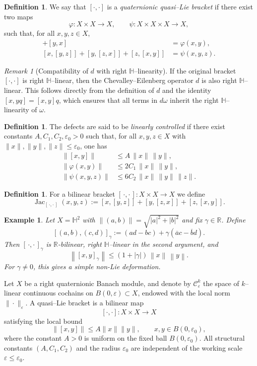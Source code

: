 \documentclass[10pt]{amsart}
\newcommand{\norm}[1]{\left\lVert #1 \right\rVert}
\newcommand{\Jac}{\operatorname{Jac}}
\numberwithin{equation}{section}
\newtheorem{example}[theorem]{Example}
\theoremstyle{remark}
\newtheorem{rmk}[theorem]{Remark}
\theoremstyle{definition}
\newtheorem{dfn}[theorem]{Definition}
\begin{document}
\begin{dfn}\label{def:quasiLie}
We say that $[\cdot,\cdot]$ is a \emph{quaternionic quasi--Lie bracket} if there exist two maps
\[
\varphi : X\times X \to X,
\qquad
\psi : X\times X\times X \to X,
\]
such that, for all $x,y,z\in X$,
\begin{align}
[x,y] + [y,x] &= \varphi(x,y), \label{eq:phiDef}\\
[x,[y,z]] + [y,[z,x]] + [z,[x,y]] &= \psi(x,y,z). \label{eq:psiDef}
\end{align}
\end{dfn}
\begin{rmk}[Compatibility of $d$ with right $\mathbb{H}$--linearity]
If the original bracket $[\cdot,\cdot]$ is right $\mathbb{H}$--linear, then the Chevalley--Eilenberg operator $d$ is also right $\mathbb{H}$--linear. This follows directly from the definition of $d$ and the identity $[x, yq] = [x, y]q$, which ensures that all terms in $d\omega$ inherit the right $\mathbb{H}$--linearity of $\omega$.
\end{rmk}
\begin{dfn}\label{def:controle}
The defects are said to be \emph{linearly controlled} if there exist constants
$A,C_1,C_2,\varepsilon_0>0$ such that, for all $x,y,z\in X$ with
$\|x\|,\|y\|,\|z\|\le \varepsilon_0$, one has
\begin{align}
\|[x,y]\| &\le A\,\|x\|\,\|y\|, \label{eq:bilinear}\\
\|\varphi(x,y)\| &\le 2C_1\,\|x\|\,\|y\|, \label{eq:boundPhi}\\
\|\psi(x,y,z)\| &\le 6C_2\,\|x\|\,\|y\|\,\|z\|. \label{eq:psiBound}
\end{align}
\end{dfn}
\begin{dfn}\label{dfn:Jac}
For a bilinear bracket $[\,\cdot,\cdot\,]:X\times X\to X$ we define
\[
\Jac_{[\,\cdot,\cdot\,]}(x,y,z)
:= [x,[y,z]]+[y,[z,x]]+[z,[x,y]].
\]
\end{dfn}
\begin{example}
Let $X=\mathbb{H}^2$ with $\norm{(a,b)}=\sqrt{|a|^2+|b|^2}$ and fix $\gamma\in\mathbb{R}$. Define
\[
[(a,b),(c,d)]_{\gamma} := (ad - bc) + \gamma(\overline{a}c - \overline{b}d).
\]
Then $[\,\cdot,\cdot\,]_\gamma$ is $\mathbb{R}$-bilinear, right $\mathbb{H}$--linear in the \emph{second} argument, and
\[
\norm{[x,y]_\gamma}\le (1+|\gamma|)\,\norm{x}\,\norm{y}.
\]
For $\gamma\neq 0$, this gives a simple non-Lie deformation.
\end{example}
Let $X$ be a right quaternionic Banach module, and denote by $\mathcal C^k_\varepsilon$
the space of $k$–linear continuous cochains on $B(0,\varepsilon)\subset X$,
endowed with the local norm $\|\cdot\|_\varepsilon$.
A quasi–Lie bracket is a bilinear map
\[
[\cdot,\cdot]\colon X\times X\to X
\]
satisfying the local bound
\[
\|[x,y]\|\le A\|x\|\|y\|, \qquad x,y\in B(0,\varepsilon_0),
\]
where the constant $A>0$ is uniform on the fixed ball $B(0,\varepsilon_0)$.
All structural constants $(A,C_1,C_2)$ and the radius $\varepsilon_0$ are
independent of the working scale $\varepsilon\le\varepsilon_0$.
\end{document}
